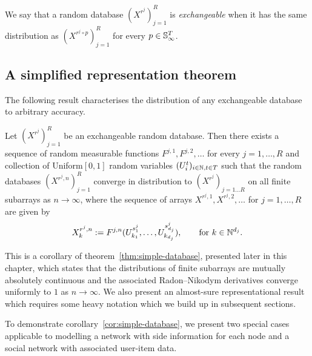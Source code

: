 \begin{definition}
We say that a random database $(X^{r^j})_{j=1}^R$ is \emph{exchangeable} when it has the same distribution as $(X^{r^j\circ p})_{j=1}^R$ for every $p \in \mathbb{S}_{\infty}^T$.
\end{definition}



\subsection{A simplified representation theorem}

The following result characterises the distribution of any exchangeable database to arbitrary accuracy.

\begin{cor}
  \label{cor:simple-database}
   Let $(X^{r^j})_{j=1}^R$ be an exchangeable random database.
   Then there exists a sequence of random measurable functions $F^{j,1}, F^{j,2}, \dotsc$ for 
   every $j=1,\ldots, R$ and collection of \iid Uniform$[0,1]$ random variables $(U^t_i)_{i\in\mathbb{N},t \in T}$ such that 
   the random databases $(X^{r^j,n})_{j=1}^R$
    converge in distribution to $(X^{r^j})_{j=1\ldots R}$ on all finite subarrays as $n\to \infty$, where   
   the sequence of arrays $X^{r^j,1},X^{r^j,2},\dotsc$ for $j = 1,\dotsc,R$ are given by
   \[
     X^{r^j,n}_{k} := F^{j,n}(U^{s^j_1}_{k_1},\dotsc,U^{s^j_{d_j}}_{k_{d_j}}), \qquad \text{for } k \in \mathbb{N}^{d_j}.
   \]
\end{cor}

This is a corollary of theorem~\ref{thm:simple-database}, presented later in this chapter, which states that the distributions of finite subarrays are mutually absolutely continuous and the associated Radon--Nikodym derivatives converge uniformly to $1$ as $n \to \infty$.
We also present an almost-sure representational result which requires some heavy notation which we build up in subsequent sections.

To demonstrate corollary~\ref{cor:simple-database}, we present two special cases applicable to modelling a network with side information for each node and a social network with associated user-item data.

